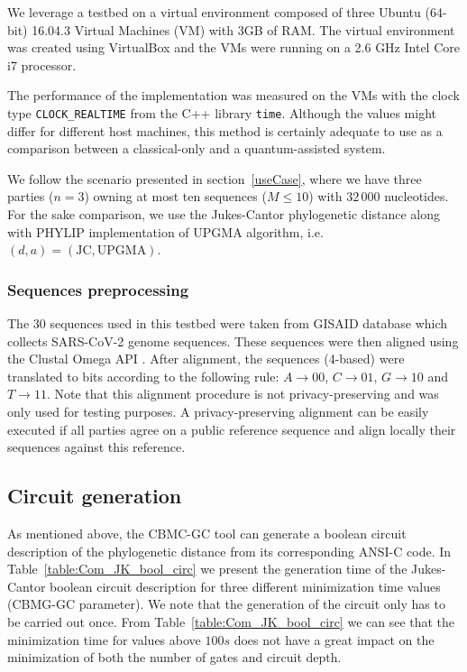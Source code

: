 We leverage a testbed on a virtual environment composed of three Ubuntu (64-bit) 16.04.3 Virtual Machines (VM) with 3GB of RAM. The virtual environment was created using VirtualBox and the VMs were running on a 2.6 GHz Intel Core i7 processor.

The performance of the implementation was measured on the VMs with the clock type \texttt{CLOCK\_REALTIME} from the C++ library \texttt{time}. Although the values might differ for different host machines, this method is certainly adequate to use as a comparison between a classical-only and a quantum-assisted system.

We follow the scenario presented in section~\ref{useCase}, where we have three parties ($n=3$) owning at most ten sequences ($M\leq10$) with $32\,000$ nucleotides. For the sake comparison, we use the Jukes-Cantor phylogenetic distance along with PHYLIP implementation of UPGMA algorithm, i.e. $(d, a) = (\text{JC}, \text{UPGMA})$.

\subsubsection{Sequences preprocessing}

The $30$ sequences used in this testbed were taken from GISAID database \cite{GISAID} which collects SARS-CoV-2 genome sequences. These sequences were then aligned using the Clustal Omega API \cite{MPL19}. After alignment, the sequences (4-based) were translated to bits according to the following rule: $A \rightarrow 00$, $C \rightarrow 01$, $G \rightarrow 10$ and $T \rightarrow 11$. Note that this alignment procedure is not privacy-preserving and was only used for testing purposes. A privacy-preserving alignment can be easily executed if all parties agree on a public reference sequence and align locally their sequences against this reference.


\subsection{Circuit generation}

As mentioned above, the CBMC-GC tool can generate a boolean circuit description of the phylogenetic distance from its corresponding ANSI-C code. In Table~\ref{table:Com_JK_bool_circ} we present the generation time of the Jukes-Cantor boolean circuit description for three different minimization time values (CBMG-GC parameter). We note that the generation of the circuit only has to be carried out once. From Table~\ref{table:Com_JK_bool_circ} we can see that the minimization time for values above $100s$ does not have a great impact on the minimization of both the number of gates and circuit depth.

